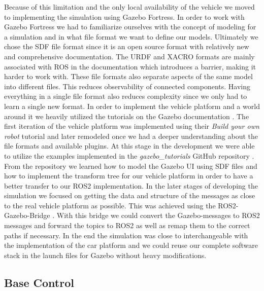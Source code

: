 Because of this limitation and the only local availability of the vehicle we moved to implementing the simulation using Gazebo Fortress. In order to work with Gazebo Fortress we had to familiarize ourselves with the concept of modeling for a simulation and in what file format we want to define our models. Ultimately we chose the SDF file format since it is an open source format with relatively new and comprehensive documentation. The URDF and XACRO formats are mainly associated with ROS in the documentation which introduces a barrier, making it harder to work with. These file formats also separate aspects of the same model into different files. This reduces observability of connected components. Having everything in a single file format also reduces complexity since we only had to learn a single new format. In order to implement the vehicle platform and a world around it we heavily utilized the tutorials on the Gazebo documentation \cite{gazebo-documentation}. The first iteration of the vehicle platform was implemented using their \textit{Build your own robot} tutorial and later remodeled once we had a deeper understanding about the file formats and available plugins. At this stage in the development we were able to utilize the examples implemented in the \textit{gazebo\_tutorials} GitHub repository \cite{gazebo-tutorials}. From the repository we learned how to model the Gazebo UI using SDF files and how to implement the transform tree for our vehicle platform in order to have a better transfer to our ROS2 implementation. In the later stages of developing the simulation we focused on getting the data and structure of the messages as close to the real vehicle platform as possible. This was achieved using the ROS2-Gazebo-Bridge \cite{ros-gz-bridge}. With this bridge we could convert the Gazebo-messages to ROS2 messages and forward the topics to ROS2 as well as remap them to the correct paths if necessary. In the end the simulation was close to interchangeable with the implementation of the car platform and we could reuse our complete software stack in the launch files for Gazebo without heavy modifications.

\subsection{Base Control}

